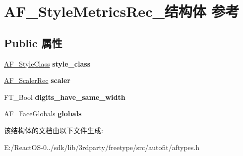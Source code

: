 \hypertarget{struct_a_f___style_metrics_rec__}{}\section{A\+F\+\_\+\+Style\+Metrics\+Rec\+\_\+结构体 参考}
\label{struct_a_f___style_metrics_rec__}
\subsection*{Public 属性}
\begin{DoxyCompactItemize}
\item 
\mbox{\label{struct_a_f___style_metrics_rec___a2e58dd2c1391969f5ff0f67df9b3aecd}} 
\hyperlink{struct_a_f___style_class_rec__}{A\+F\+\_\+\+Style\+Class} {\bfseries style\+\_\+class}
\item 
\mbox{\label{struct_a_f___style_metrics_rec___a05ba109af541c5a170d8684a2dc50673}} 
\hyperlink{struct_a_f___scaler_rec__}{A\+F\+\_\+\+Scaler\+Rec} {\bfseries scaler}
\item 
\mbox{\label{struct_a_f___style_metrics_rec___a1bda72600a46e3a2db54a847752cf25f}} 
F\+T\+\_\+\+Bool {\bfseries digits\+\_\+have\+\_\+same\+\_\+width}
\item 
\mbox{\label{struct_a_f___style_metrics_rec___a64be35a74a0be98fa31cc150a97a140f}} 
\hyperlink{struct_a_f___face_globals_rec__}{A\+F\+\_\+\+Face\+Globals} {\bfseries globals}
\end{DoxyCompactItemize}


该结构体的文档由以下文件生成\+:\begin{DoxyCompactItemize}
\item 
E\+:/\+React\+O\+S-\/0../sdk/lib/3rdparty/freetype/src/autofit/aftypes.\+h\end{DoxyCompactItemize}
